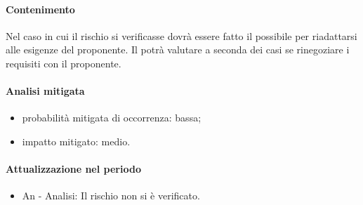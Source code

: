 			\paragraph{Contenimento} Nel caso in cui il rischio si verificasse dovrà essere fatto il possibile per riadattarsi alle esigenze del proponente. Il \responsabilediprogetto{} potrà valutare a seconda dei casi se rinegoziare i requisiti con il proponente.
			\paragraph{Analisi mitigata}
			\begin{itemize}
			\item{probabilità mitigata di occorrenza:} bassa;
			\item{impatto mitigato:} medio.
			\end{itemize}
			\paragraph{Attualizzazione nel periodo}
				\begin{itemize}
				\item{An - Analisi}: Il rischio non si è verificato.
				\end{itemize}
